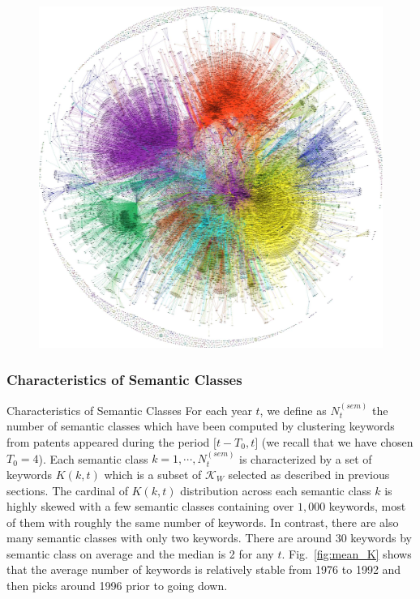 \begin{figure}
\includegraphics[width=\linewidth]{Figures/Final/C-patentsmining-rawnetwork}
\label{fig:patentsmining:rawnetwork}
\end{figure}



\subsubsection*{Characteristics of Semantic Classes}{Characteristics of Semantic Classes}
\label{characteristics}
For each year $t$, we define as $N^{(sem)}_t$ the number of semantic classes which have been computed by clustering keywords from patents appeared during the period $\big[ t-T_0, t \big]$ (we recall that we have chosen $T_0=4$). Each semantic class $k =  1, \cdots, N^{(sem)}_t$ is characterized by a set of keywords $K(k,t)$ which is a subset of $\mathcal{K}_W$ selected as described in previous sections. The cardinal of $K(k, t)$ distribution across each semantic class $k$ is highly skewed with a few semantic classes containing over $1,000$ keywords, most of them with roughly the same number of keywords. In contrast, there are also many semantic classes with only two keywords. There are around 30 keywords by semantic class on average and the median is 2 for any $t$. Fig.~\ref{fig:mean_K} shows that the average number of keywords is relatively stable from 1976 to 1992 and then picks around 1996 prior to going down.



